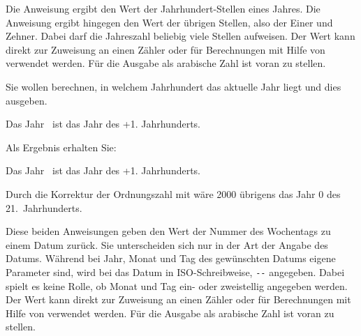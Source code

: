 \begin{Declaration}
\end{Declaration}%
Die Anweisung  ergibt
den Wert der Jahrhundert-Stellen eines Jahres. Die Anweisung
 ergibt hingegen den Wert der übrigen Stellen, also der
Einer und Zehner. Dabei darf die Jahreszahl beliebig viele Stellen aufweisen.
Der Wert kann direkt zur Zuweisung an einen Zähler oder für Berechnungen mit
Hilfe von  verwendet werden. Für die
Ausgabe  als arabische Zahl ist 
voran zu stellen.
%
\begin{Example}
  Sie wollen berechnen, in welchem Jahrhundert das aktuelle Jahr liegt und
  dies ausgeben.
\begin{lstcode}
  Das Jahr \the\year\ ist das Jahr 
  \the\DecadePart{\year} des 
  \the\numexpr \CenturyPart{\year}+1\relax. 
  Jahrhunderts.
\end{lstcode}
  Als Ergebnis erhalten Sie:
  \begin{ShowOutput}
    Das Jahr \the\year\ ist das Jahr \the\DecadePart{\year} des \the\numexpr
    \CenturyPart{\year}+1\relax.  Jahrhunderts.
  \end{ShowOutput}
  Durch die Korrektur der Ordnungszahl mit  wäre 2000
  übrigens das Jahr 0 des 21.~Jahrhunderts.
\end{Example}%
\EndIndexGroup%
\ExampleEndFix


\begin{Declaration}
\end{Declaration}%
Diese beiden Anweisungen geben den Wert
der Nummer des Wochentags zu einem Datum zurück. Sie
unterscheiden sich nur in der Art der Angabe des Datums. Während bei
 Jahr, Monat und Tag des gewünschten Datums eigene Parameter
sind, wird bei  das Datum in ISO-Schreibweise,
\texttt{-}\texttt{-} angegeben. Dabei
spielt es keine Rolle, ob Monat und Tag ein- oder zweistellig angegeben
werden. Der Wert kann direkt zur Zuweisung an einen Zähler oder für
Berechnungen mit Hilfe von  verwendet
werden. Für die Ausgabe als arabische Zahl ist
 voran zu stellen.

